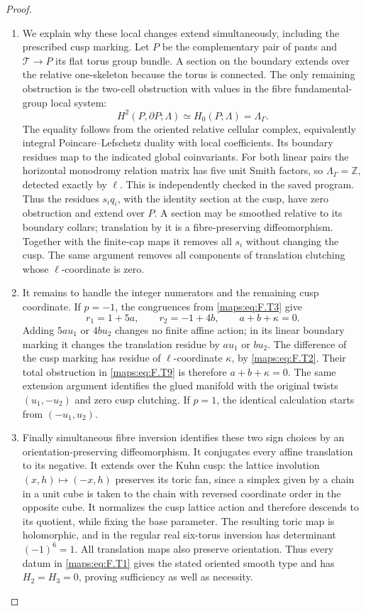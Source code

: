 \begin{proof}
\begin{enumerate}[label=\arabic*.]
\item We explain why these local changes extend simultaneously,
including the prescribed cusp marking.
Let $P$ be the complementary pair of pants and
$\mathcal T\to P$ its flat torus group bundle.
A section on the boundary extends over the relative
one-skeleton because the torus is connected.
The only remaining obstruction is the two-cell obstruction
with values in the fibre fundamental-group local system:
\[
 H^2(P,\partial P;\Lambda)
        \simeq H_0(P;\Lambda)=\Lambda_\Gamma.
 \tag{F.T9}\label{maps:eq:F.T9}
\]
The equality follows from the oriented relative cellular
complex, equivalently integral Poincare--Lefschetz duality
with local coefficients.  Its boundary residues map to
the indicated global coinvariants.
For both linear pairs the horizontal monodromy relation
matrix has five unit Smith factors, so
$\Lambda_\Gamma=\mathbb Z$, detected exactly by $\ell$.
This is independently checked in the saved program.
Thus the residues $s_iq_i$, with the identity section at the
cusp, have zero obstruction and extend over $P$.
A section may be smoothed relative to its boundary collars;
translation by it is a fibre-preserving diffeomorphism.
Together with the finite-cap maps it removes all $s_i$
without changing the cusp.
The same argument removes all components of translation
clutching whose $\ell$-coordinate is zero.

\item It remains to handle the integer numerators and the remaining
cusp coordinate.  If $p=-1$, the congruences from \eqref{maps:eq:F.T3}
give
\[
 r_1=1+5a,\qquad r_2=-1+4b,
 \qquad a+b+\kappa=0.
 \tag{F.T10}\label{maps:eq:F.T10}
\]
Adding $5a u_1$ or $4b u_2$ changes no finite affine action;
in its linear boundary marking it changes the translation
residue by $a u_1$ or $b u_2$.
The difference of the cusp marking has residue of
$\ell$-coordinate $\kappa$, by \eqref{maps:eq:F.T2}.
Their total obstruction in \eqref{maps:eq:F.T9} is therefore
$a+b+\kappa=0$.
The same extension argument identifies the glued manifold
with the original twists $(u_1,-u_2)$ and zero cusp
clutching.
If $p=1$, the identical calculation starts from
$(-u_1,u_2)$.

\item Finally simultaneous fibre inversion identifies these two
sign choices by an orientation-preserving diffeomorphism.
It conjugates every affine translation to its negative.
It extends over the Kuhn cusp: the lattice involution
$(x,h)\mapsto(-x,h)$ preserves its toric fan, since a
simplex given by a chain in a unit cube is taken to the
chain with reversed coordinate order in the opposite cube.
It normalizes the cusp lattice action and therefore descends
to its quotient, while fixing the base parameter.  The resulting toric map is holomorphic,
and in the regular real six-torus inversion has determinant
$(-1)^6=1$.  All translation maps also preserve orientation.
Thus every datum in \eqref{maps:eq:F.T1} gives the stated oriented smooth
type and has $H_2=H_3=0$, proving sufficiency as well as
necessity.

\end{enumerate}
\end{proof}




